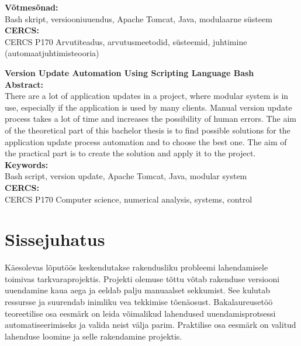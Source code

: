 \documentclass[12pt]{article}
\renewcommand{\headrulewidth}{0pt}
\begin{document}
  \noindent\textbf{Võtmesõnad:}\\
  Bash skript, versiooniuuendus, Apache Tomcat, Java, modulaarne süsteem\\
  
  \noindent\textbf{CERCS:}\\
  CERCS P170 Arvutiteadus, arvutusmeetodid, süsteemid, juhtimine (automaatjuhtimisteooria)
  \vspace{2cm}

  \noindent\textbf{Version Update Automation Using Scripting Language Bash}\\

  \noindent\textbf{Abstract:}\\
  There are a lot of application updates in a project, where modular system is in use, especially if the application is used by many clients. Manual version update process takes a lot of time and increases the possibility of human errors. The aim of the theoretical part of this bachelor thesis is to find possible solutions for the application update process automation and to choose the best one. The aim of the practical part is to create the solution and apply it to the project.\\

  \noindent\textbf{Keywords:}\\
  Bash script, version update, Apache Tomcat, Java, modular system\\
  
  \noindent\textbf{CERCS:}\\
  CERCS P170 Computer science, numerical analysis, systems, control
  
  \newpage
 
  \tableofcontents
  \fancypagestyle{plain}{%
    \renewcommand{\headrulewidth}{0pt}%
    \fancyhf{}%
    \fancyfoot[R]{\thepage}%
  }
 
  \newpage
  
  \section*{Sissejuhatus}
  \label{sissejuhatus}
  
  Käesolevas lõputöös keskendutakse rakendusliku probleemi lahendamisele toimivas tarkvaraprojektis. Projekti olemuse tõttu võtab rakenduse versiooni uuendamine kaua aega ja eeldab palju manuaalset sekkumist. See kulutab ressursse ja suurendab inimliku vea tekkimise tõenäosust. Bakalaureusetöö teoreetilise osa eesmärk on leida võimalikud lahendused uuendamisprotsessi automatiseerimiseks ja valida neist välja parim. Praktilise osa eesmärk on valitud lahenduse loomine ja selle rakendamine projektis.
  
\end{document}
